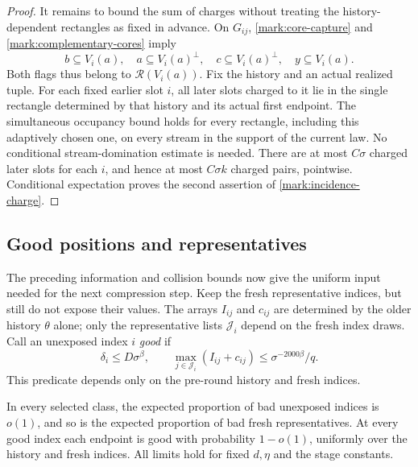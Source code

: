 \begin{proof}
It remains to bound the sum of charges without treating the
history-dependent rectangles as fixed in advance. On $G_{ij}$,
\eqref{mark:core-capture} and \eqref{mark:complementary-cores} imply
\[
 b\subseteq V_i(a),\quad a\subseteq V_i(a)^\perp,
 \quad c\subseteq V_i(a)^\perp,\quad y\subseteq V_i(a).
\]
Both flags thus belong to $\mathcal R(V_i(a))$. Fix the history and
an actual realized tuple. For each fixed earlier slot $i$, all later
slots charged to it lie in the single rectangle determined by that
history and its actual first endpoint. The simultaneous occupancy
bound holds for every rectangle, including this adaptively chosen
one, on every stream in the support of the current law. No conditional
stream-domination estimate is needed. There are at most $C\sigma$
charged later slots for each $i$,
and hence at most $C\sigma k$ charged pairs, pointwise. Conditional
expectation proves the second assertion of
\eqref{mark:incidence-charge}.
\end{proof}

\subsection{Good positions and representatives}

The preceding information and collision bounds now give the uniform
input needed for the next compression step. Keep the fresh representative
indices, but still do not expose their values. The arrays $I_{ij}$ and
$c_{ij}$ are determined by the older history $\theta$ alone; only the
representative lists $\mathcal J_i$ depend on the fresh index draws.
Call an unexposed index
$i$ \emph{good} if
\begin{equation}\label{mark:good-index}
 \delta_i\le D\sigma^\beta,\qquad
 \max_{j\in\mathcal J_i}(I_{ij}+c_{ij})
                     \le \sigma^{-2000\beta}/q.
\end{equation}
This predicate depends only on the pre-round history and fresh indices.

\begin{proposition}\label{mark:good-indices}
In every selected class, the expected proportion of bad unexposed
indices is $o(1)$, and so is the expected proportion of bad fresh
representatives. At every good index each endpoint is good with
probability $1-o(1)$, uniformly over the history and fresh indices.
All limits hold for fixed $d,\eta$ and the stage constants.
\end{proposition}

